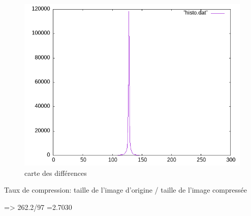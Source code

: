 \documentclass{article}
\begin{document}
\begin{figure}[h]
\centerline{\includegraphics[scale=0.4]{./rendus/histoMED.png} }
\caption{carte des différences}
\end{figure}

Taux de compression: taille de l'image d'origine / taille de l'image compressée

=> 262.2/97 =2.7030
\end{document}
